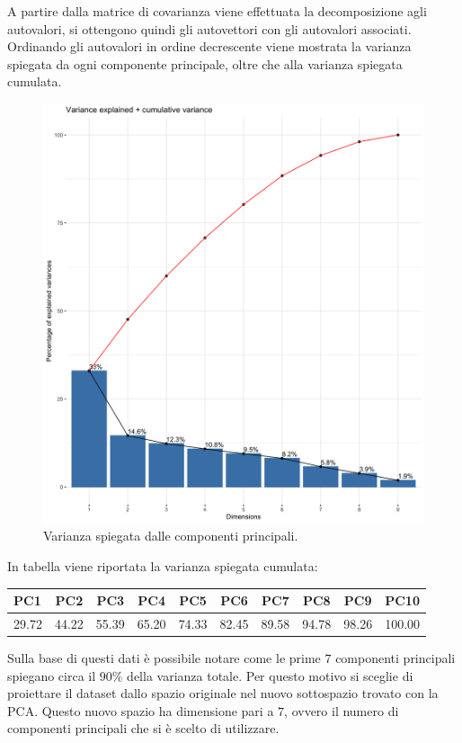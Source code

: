 A partire dalla matrice di covarianza viene effettuata la decomposizione agli autovalori, si ottengono quindi gli autovettori con gli autovalori associati. Ordinando gli autovalori in ordine decrescente viene mostrata la varianza spiegata da ogni componente principale, oltre che alla varianza spiegata cumulata.

\begin{figure}[H]
	\centering
	\includegraphics[width=13cm]{../images/pca_variance_explained.png}
	\caption{Varianza spiegata dalle componenti principali.}
\end{figure}

In tabella viene riportata la varianza spiegata cumulata:


	\begin{tabular}{|l c c c c c c c c c|} 
		\hline
		PC1 & PC2 & PC3 & PC4 & PC5 & PC6 & PC7 & PC8 & PC9 & PC10\\
		\hline
		29.72 &
		44.22 &
		55.39 &
		65.20 &
		74.33 &
		82.45 &
		89.58 &
		94.78 &
		98.26 &
		100.00 \\
		\hline
		
	\end{tabular}


Sulla base di questi dati è possibile notare come le prime $7$ componenti principali spiegano circa il $90\%$ della varianza totale. Per questo motivo si sceglie di proiettare il dataset dallo spazio originale nel nuovo sottospazio trovato con la PCA. Questo nuovo spazio ha dimensione pari a $7$, ovvero il numero di componenti principali che si è scelto di utilizzare.




